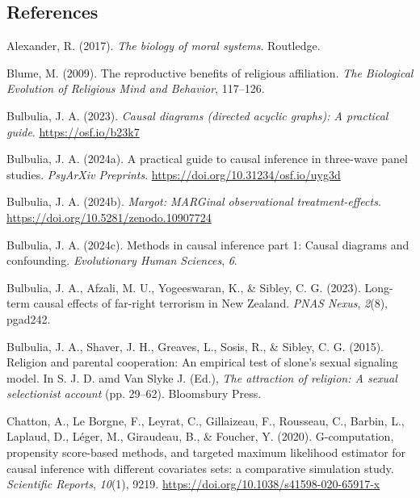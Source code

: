 \documentclass[
  single column]{article}
\newlength{\cslhangindent}
\newenvironment{CSLReferences}[2] %
 {\begin{list}{}{%
  \setlength{\itemindent}{0pt}
  \setlength{\leftmargin}{0pt}
  \setlength{\parsep}{0pt}
  \ifodd #1
   \setlength{\leftmargin}{\cslhangindent}
   \setlength{\itemindent}{-1\cslhangindent}
  \fi
  \setlength{\itemsep}{#2\baselineskip}}}
 {\end{list}}
\begin{document}
\subsection*{References}\label{references}

\label{refs}
\begin{CSLReferences}{1}{0}
Alexander, R. (2017). \emph{The biology of moral systems}. Routledge.

Blume, M. (2009). The reproductive benefits of religious affiliation.
\emph{The Biological Evolution of Religious Mind and Behavior},
117--126.

Bulbulia, J. A. (2023). \emph{Causal diagrams (directed acyclic graphs):
A practical guide}. \url{https://osf.io/b23k7}

Bulbulia, J. A. (2024a). A practical guide to causal inference in
three-wave panel studies. \emph{PsyArXiv Preprints}.
\url{https://doi.org/10.31234/osf.io/uyg3d}

Bulbulia, J. A. (2024b). \emph{Margot: MARGinal observational
treatment-effects}. \url{https://doi.org/10.5281/zenodo.10907724}

Bulbulia, J. A. (2024c). Methods in causal inference part 1: Causal
diagrams and confounding. \emph{Evolutionary Human Sciences}, \emph{6}.

Bulbulia, J. A., Afzali, M. U., Yogeeswaran, K., \& Sibley, C. G.
(2023). Long-term causal effects of far-right terrorism in {N}ew
{Z}ealand. \emph{PNAS Nexus}, \emph{2}(8), pgad242.

Bulbulia, J. A., Shaver, J. H., Greaves, L., Sosis, R., \& Sibley, C. G.
(2015). Religion and parental cooperation: An empirical test of slone's
sexual signaling model. In S. J. D. amd Van Slyke J. (Ed.), \emph{The
attraction of religion: A sexual selectionist account} (pp. 29--62).
Bloomsbury Press.

Chatton, A., Le Borgne, F., Leyrat, C., Gillaizeau, F., Rousseau, C.,
Barbin, L., Laplaud, D., Léger, M., Giraudeau, B., \& Foucher, Y.
(2020). G-computation, propensity score-based methods, and targeted
maximum likelihood estimator for causal inference with different
covariates sets: a comparative simulation study. \emph{Scientific
Reports}, \emph{10}(1), 9219.
\url{https://doi.org/10.1038/s41598-020-65917-x}


\end{CSLReferences}
\end{document}
